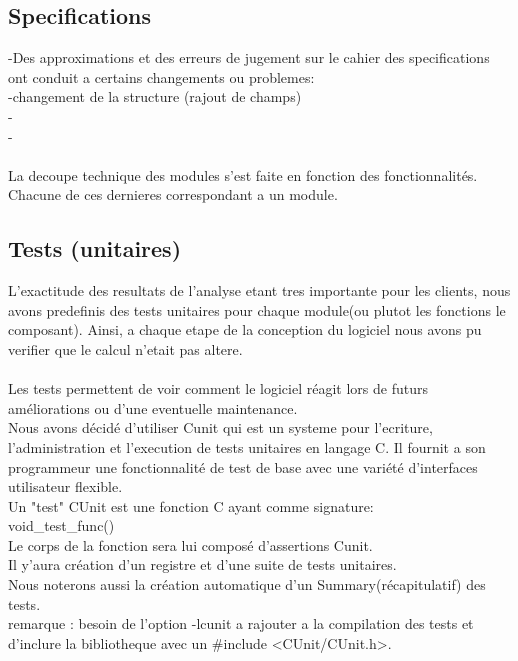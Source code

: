 \documentclass[a4]{article}
\begin{document}
		
		\subsection{Specifications}
		-Des approximations et des erreurs de jugement sur le cahier des specifications ont conduit a certains changements ou problemes:\\
		-changement de la structure (rajout de champs)\\
		-\\
		-\\ \\
		
		
		
		

		La decoupe technique des modules s'est faite en fonction des fonctionnalités.
		 Chacune de ces dernieres correspondant a un module.
		
		\subsection{Tests (unitaires)}
		L’exactitude des resultats de l'analyse etant tres importante pour les clients, nous avons predefinis des tests
unitaires pour chaque module(ou plutot les fonctions le composant). Ainsi, a chaque etape de la conception du logiciel
nous avons pu verifier que le calcul n’etait pas altere. \\ \\
Les tests permettent de voir comment le logiciel réagit lors de futurs améliorations ou d'une eventuelle maintenance. \\ 
 
Nous avons décidé d'utiliser Cunit qui est un systeme pour l'ecriture, l'administration et l'execution de tests unitaires
en langage C. Il fournit a son programmeur une fonctionnalité de test de base avec une variété d'interfaces utilisateur flexible.\\
Un "test"  CUnit est une fonction C ayant comme signature:\\
void\_test\_func()\\
Le corps de la fonction sera lui composé d'assertions Cunit.\\
Il y'aura création d'un registre et d'une suite de tests unitaires.\\
Nous noterons aussi la création automatique d'un Summary(récapitulatif) des tests.\\
remarque : besoin de l'option -lcunit a rajouter a la compilation des tests et d'inclure la bibliotheque avec un
\#include <CUnit/CUnit.h>.\\ \\ \\ 
\end{document}
